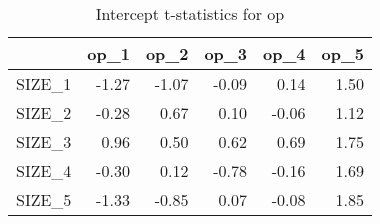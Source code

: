 \begin{table}[ht]
\centering
\caption{Intercept t-statistics for op} 
\begin{tabular}{rrrrrr}
  \hline
 & op\_1 & op\_2 & op\_3 & op\_4 & op\_5 \\ 
  \hline
SIZE\_1 & -1.27 & -1.07 & -0.09 & 0.14 & 1.50 \\ 
  SIZE\_2 & -0.28 & 0.67 & 0.10 & -0.06 & 1.12 \\ 
  SIZE\_3 & 0.96 & 0.50 & 0.62 & 0.69 & 1.75 \\ 
  SIZE\_4 & -0.30 & 0.12 & -0.78 & -0.16 & 1.69 \\ 
  SIZE\_5 & -1.33 & -0.85 & 0.07 & -0.08 & 1.85 \\ 
   \hline
\end{tabular}
\end{table}



